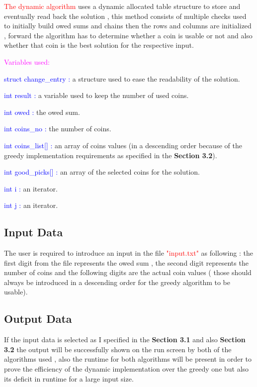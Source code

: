 \documentclass[12]{article}
\begin{document}
\newpage

\textcolor{red}{The dynamic algorithm} uses a dynamic allocated table structure to store and eventually read back the solution , this method consists of multiple checks used to initially build owed sums and chains then the rows and columns are initialized , forward the algorithm has to determine whether a coin is usable or not and also whether that coin is the best solution for the respective input.

\textcolor{magenta}{Variables used:} 

\textcolor{blue}{struct change_entry :} a structure used to ease the readability of the solution.

\textcolor{blue}{int result :} a variable used to keep the number of used coins.

\textcolor{blue}{int owed :} the owed sum.

\textcolor{blue}{int coins_no :} the number of coins.

\textcolor{blue}{int coins_list[] : } an array of coins values (in a descending order because of the greedy implementation requirements as specified in the \textbf{Section 3.2}).

\textcolor{blue}{int good_picks[] : } an array of the selected coins for the solution.

\textcolor{blue}{int i :} an iterator.

\textcolor{blue}{int j :} an iterator.

\subsection{Input Data}
\textbf{}

The user is required to introduce an input in the file \textcolor{red}{"input.txt"} as following : the first digit from the file represents the owed sum , the second digit represents the number of coins and the following digits are the actual coin values ( those should always be introduced in a descending order for the greedy algorithm to be usable).

\subsection{Output Data}
\textbf{}

If the input data is selected as I specified in the \textbf{Section 3.1} and also \textbf{Section 3.2} the output will be successfully shown on the run screen by both of the algorithms used , also the runtime for both algorithms will be present in order to prove the efficiency of the dynamic implementation over the greedy one but also its deficit in runtime for a large input size.
\end{document}
